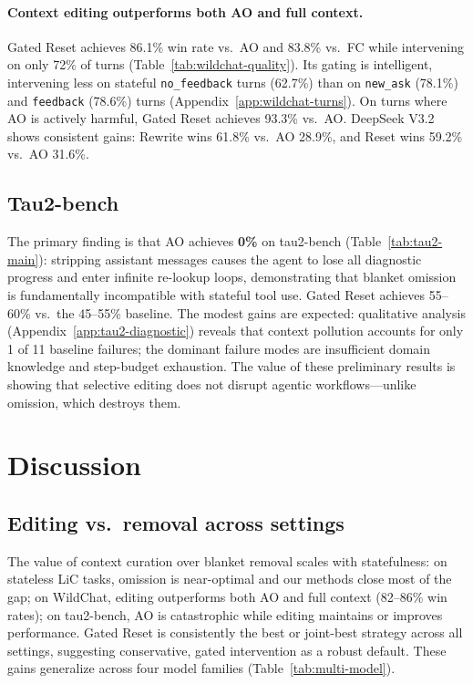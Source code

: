 \documentclass{article} %
\begin{document}
\paragraph{Context editing outperforms both AO and full context.}
Gated Reset achieves 86.1\% win rate vs.\ AO and 83.8\% vs.\ FC while intervening on only 72\% of turns (Table~\ref{tab:wildchat-quality}). Its gating is intelligent, intervening less on stateful \texttt{no\_feedback} turns (62.7\%) than on \texttt{new\_ask} (78.1\%) and \texttt{feedback} (78.6\%) turns (Appendix~\ref{app:wildchat-turns}). On turns where AO is actively harmful, Gated Reset achieves 93.3\% vs.\ AO. DeepSeek V3.2 shows consistent gains: Rewrite wins 61.8\% vs.\ AO 28.9\%, and Reset wins 59.2\% vs.\ AO 31.6\%.


\subsection{Tau2-bench}
\label{sec:tau2-results}

The primary finding is that AO achieves \textbf{0\%} on tau2-bench (Table~\ref{tab:tau2-main}): stripping assistant messages causes the agent to lose all diagnostic progress and enter infinite re-lookup loops, demonstrating that blanket omission is fundamentally incompatible with stateful tool use. Gated Reset achieves 55--60\% vs.\ the 45--55\% baseline. The modest gains are expected: qualitative analysis (Appendix~\ref{app:tau2-diagnostic}) reveals that context pollution accounts for only 1 of 11 baseline failures; the dominant failure modes are insufficient domain knowledge and step-budget exhaustion. The value of these preliminary results is showing that selective editing does not disrupt agentic workflows---unlike omission, which destroys them.


\section{Discussion}
\label{sec:discussion}

\subsection{Editing vs.\ removal across settings}

The value of context curation over blanket removal scales with statefulness: on stateless LiC tasks, omission is near-optimal and our methods close most of the gap; on WildChat, editing outperforms both AO and full context (82--86\% win rates); on tau2-bench, AO is catastrophic while editing maintains or improves performance. Gated Reset is consistently the best or joint-best strategy across all settings, suggesting conservative, gated intervention as a robust default. These gains generalize across four model families (Table~\ref{tab:multi-model}).
\end{document}
